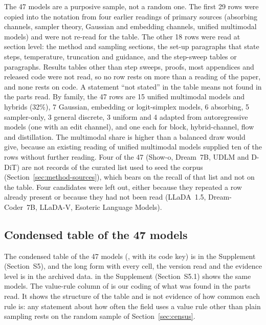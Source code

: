 The 47 models are a purposive sample, not a random one. The first 29 rows were copied into the notation from four earlier readings of primary sources (absorbing channels, sampler theory, Gaussian and embedding channels, unified multimodal models) and were not re-read for the table. The other 18 rows were read at section level: the method and sampling sections, the set-up paragraphs that state steps, temperature, truncation and guidance, and the step-sweep tables or paragraphs. Results tables other than step sweeps, proofs, most appendices and released code were not read, so no row rests on more than a reading of the paper, and none rests on code. %
A statement ``not stated'' in the table means not found in the parts read.
By family, the 47 rows are 15 unified multimodal models and hybrids (32\%), 7 Gaussian, embedding or logit-simplex models, 6 absorbing, 5 sampler-only, 3 general discrete, 3 uniform and 4 adapted from autoregressive models (one with an edit channel), and one each for block, hybrid-channel, flow and distillation. %
The multimodal share is higher than a balanced draw would give, because an existing reading of unified multimodal models supplied ten of the rows without further reading. %
Four of the 47 (Show-o, Dream~7B, UDLM and D-DiT) are not records of the curated list used to seed the corpus (Section~\ref{sec:method-sources}), which bears on the recall of that list and not on the table. %
Four candidates were left out, either because they repeated a row already present or because they had not been read (LLaDA~1.5, Dream-Coder~7B, LLaDA-V, Esoteric Language Models). %

\subsection{Condensed table of the 47 models}
\label{sec:design-table}

The condensed table of the 47 models (\suppTabDesign{}, with its code key) is in the Supplement (Section~S5), and the long form with every cell, the version read and the evidence level is in the archived data. \suppFigDots{} in the Supplement (Section~S5.1) shows the same models.
The value-rule column of \suppTabDesign{} is our coding of what was found in the parts read. It shows the structure of the table and is not evidence of how common each rule is: any statement about how often the field uses a value rule other than plain sampling rests on the random sample of Section~\ref{sec:census}. %




